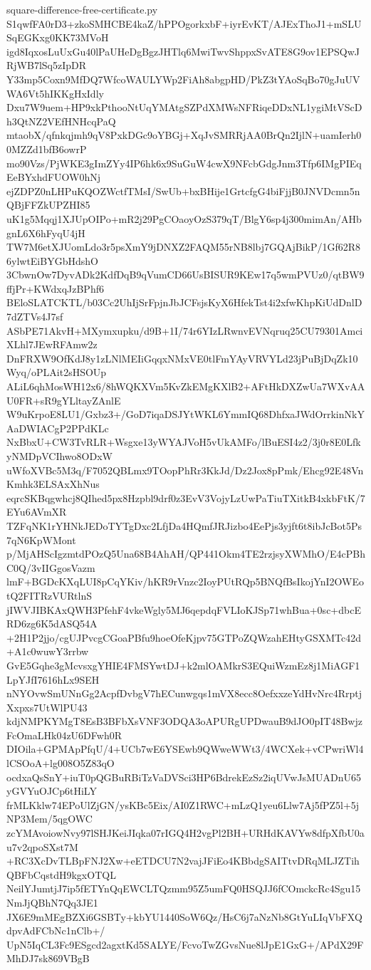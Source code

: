 \documentclass[11pt]{article}
\theoremstyle{definition}
\theoremstyle{remark}
\begin{document}
\begin{filecontents*}[overwrite]{square-difference-free-certificate.py}
S1qwfFA0rD3+zkoSMHCBE4kaZ/hPPOgorkxbF+iyrEvKT/AJExThoJ1+mSLUSqEGKxg0KK73MVoH
igd8IqxosLuUxGu40lPaUHeDgBgzJHTlq6MwiTwvShppxSvATE8G9ov1EPSQwJRjWB7lSq5zIpDR
Y33mp5Coxn9MfDQ7WfcoWAULYWp2FiAh8abgpHD/PkZ3tYAoSqBo70gJuUVWA6Vt5hIKKgHxIdly
Dxu7W9uem+HP9xkPthooNtUqYMAtgSZPdXMWsNFRiqeDDxNL1ygiMtVScDh3QtNZ2VEfHNHcqPaQ
mtaobX/qfnkqjmh9qV8PxkDGc9oYBGj+XqJvSMRRjAA0BrQn2IjlN+uamIerh00MZZd1bfB6owrP
mo90Vzs/PjWKE3gImZYy4IP6hk6x9SuGuW4cwX9NFcbGdgJnm3Tfp6IMgPIEqEeBYxhdFUOW0hNj
ejZDPZ0nLHPuKQOZWctfTMsI/SwUb+bxBHije1GrtcfgG4biFjjB0JNVDcmn5nQBjFFZkUPZHI85
uK1g5Mqqj1XJUpOIPo+mR2j29PgCOaoyOzS379qT/BlgY6sp4j300mimAn/AHbgnL6X6hFyqU4jH
TW7M6etXJUomLdo3r5psXmY9jDNXZ2FAQM55rNB8lbj7GQAjBikP/1Gf62R86ylwtEiBYGbHdshO
3CbwnOw7DyvADk2KdfDqB9qVumCD66UsBISUR9KEw17q5wmPVUz0/qtBW9ffjPr+KWdxqJzBPhf6
BEloSLATCKTL/b03Cc2UhIjSrFpjnJbJCFsjsKyX6HfekTst4i2xfwKhpKiUdDnlD7dZTVs4J7sf
ASbPE71AkvH+MXymxupku/d9B+1I/74r6YIzLRwnvEVNqruq25CU79301AmciXLhl7JEwRFAmw2z
DnFRXW9OfKdJ8y1zLNlMEIiGqqxNMxVE0tlFmYAyVRVYLd23jPuBjDqZk10Wyq/oPLAit2sHSOUp
ALiL6qhMosWH12x6/8hWQKXVm5KvZkEMgKXlB2+AFtHkDXZwUa7WXvAAU0FR+sR9gYLltayZAnlE
W9uKrpoE8LU1/Gxbz3+/GoD7iqaDSJYtWKL6YmmIQ68DhfxaJWdOrrkinNkYAaDWIACgP2PPdKLc
NxBbxU+CW3TvRLR+Wsgxe13yWYAJVoH5vUkAMFo/lBuESI4z2/3j0r8E0LfkyNMDpVCIhwo8ODxW
uWfoXVBc5M3q/F7052QBLmx9TOopPhRr3KkJd/Dz2Jox8pPmk/Ehcg92E48VnKmhk3ELSAxXhNus
eqrcSKBqgwhcj8QIhed5px8Hzpbl9drf0z3EvV3VojyLzUwPaTiuTXitkB4xkbFtK/7EYu6AVmXR
TZFqNK1rYHNkJEDoTYTgDxc2LfjDa4HQmfJRJizbo4EePjs3yjft6t8ibJcBot5Ps7qN6KpWMont
p/MjAHScIgzmtdPOzQ5Una68B4AhAH/QP441Okm4TE2rzjsyXWMhO/E4cPBhC0Q/3vIIGgosVazm
lmF+BGDcKXqLUI8pCqYKiv/hKR9rVnzc2IoyPUtRQp5BNQfBsIkojYnI2OWEotQ2FITRzVURtlnS
jIWVJIBKAxQWH3PfehF4vkeWgly5MJ6qepdqFVLIoKJSp71whBua+0sc+dbcERD6zg6K5dASQ54A
+2H1P2jjo/cgUJPvcgCGoaPBfu9hoeOfeKjpv75GTPoZQWzahEHtyGSXMTc42d+A1c0wuwY3rrbw
GvE5Gqhe3gMcvsxgYHIE4FMSYwtDJ+k2mlOAMkrS3EQuiWzmEz8j1MiAGF1LpYJfI7616hLx9SEH
nNYOvwSmUNnGg2AcpfDvbgV7hECunwgqs1mVX8ecc8OefxxzeYdHvNrc4RrptjXxpxs7UtWlPU43
kdjNMPKYMgT8EsB3BFbXsVNF3ODQA3oAPURgUPDwauB9dJO0pIT48BwjzFcOmaLHk04zU6DFwh0R
DIOila+GPMApPfqU/4+UCb7wE6YSEwb9QWweWWt3/4WCXek+vCPwriWl4lCSOoA+lg008O5Z83qO
ocdxaQsSnY+iuT0pQGBuRBiTzVaDVSci3HP6BdrekEzSz2iqUVwJsMUADnU65yGVYuOJCp6tHiLY
frMLKklw74EPoUlZjGN/ysKBc5Eix/AI0Z1RWC+mLzQ1yeu6Llw7Aj5fPZ5l+5jNP3Mem/5qgOWC
zcYMAvoiowNvy97lSHJKeiJIqka07rIGQ4H2vgPl2BH+URHdKAVYw8dfpXfbU0au7v2qpoSXst7M
+RC3XcDvTLBpFNJ2Xw+eETDCU7N2vajJFiEo4KBbdgSAITtvDRqMLJZTihQBFbCqstdH9kgxOTQL
NeilYJumtjJ7ip5fETYnQqEWCLTQzmm95Z5umFQ0HSQJJ6fCOmckcRc4Sgu15NmJjQBhN7Qq3JE1
JX6E9mMEgBZXi6GSBTy+kbYU1440SoW6Qz/HsC6j7aNzNb8GtYuLIqVbFXQdpvAdFCbNc1nClb+/
UpN5IqCL3Fc9ESgcd2agxtKd5SALYE/FcvoTwZGvsNue8lJpE1GxG+/APdX29FMhDJ7sk869VBgB

\end{filecontents*}
\end{document}
